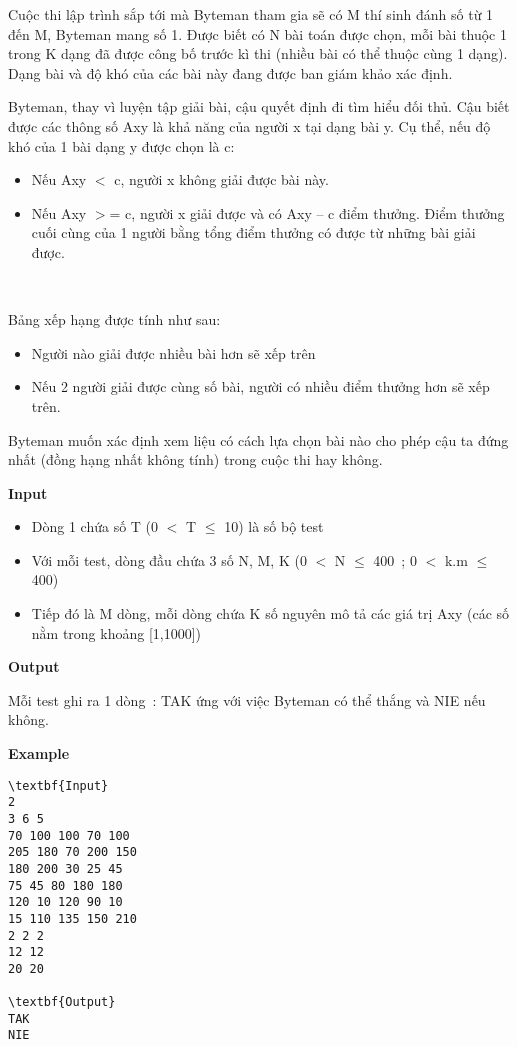 

Cuộc thi lập trình sắp tới mà Byteman tham gia sẽ có M thí sinh đánh số từ 1 đến M, Byteman mang số 1. Được biết có N bài toán được chọn, mỗi bài thuộc 1 trong K dạng đã được công bố trước kì thi (nhiều bài có thể thuộc cùng 1 dạng). Dạng bài và độ khó của các bài này đang được ban giám khảo xác định.

Byteman, thay vì luyện tập giải bài, cậu quyết định đi tìm hiểu đối thủ. Cậu biết được các thông số Axy là khả năng của người x tại dạng bài y. Cụ thể, nếu độ khó của 1 bài dạng y được chọn là c:
\begin{itemize}
	\item Nếu Axy $<$ c, người x không giải được bài này.
	\item Nếu Axy $>$= c, người x giải được và có Axy – c điểm thưởng. Điểm thưởng cuối cùng của 1 người bằng tổng điểm thưởng có được từ những bài giải được.
\end{itemize}

 

Bảng xếp hạng được tính như sau:
\begin{itemize}
	\item Người nào giải được nhiều bài hơn sẽ xếp trên
	\item Nếu 2 người giải được cùng số bài, người có nhiều điểm thưởng hơn sẽ xếp trên.
\end{itemize}

Byteman muốn xác định xem liệu có cách lựa chọn bài nào cho phép cậu ta đứng nhất (đồng hạng nhất không tính) trong cuộc thi hay không.

\textbf{Input}
\begin{itemize}
	\item Dòng 1 chứa số T (0 $<$ T  $\le$  10) là số bộ test
	\item Với mỗi test, dòng đầu chứa 3 số N, M, K (0 $<$ N  $\le$  400 ; 0 $<$ k.m  $\le$  400)
	\item Tiếp đó là M dòng, mỗi dòng chứa K số nguyên mô tả các giá trị Axy (các số nằm trong khoảng [1,1000])
\end{itemize}

\textbf{Output}

Mỗi test ghi ra 1 dòng : TAK ứng với việc Byteman có thể thắng và NIE nếu không.

\textbf{Example}
\begin{verbatim}
\textbf{Input}
2
3 6 5
70 100 100 70 100
205 180 70 200 150
180 200 30 25 45
75 45 80 180 180
120 10 120 90 10
15 110 135 150 210
2 2 2
12 12
20 20

\textbf{Output}
TAK
NIE
\end{verbatim}

